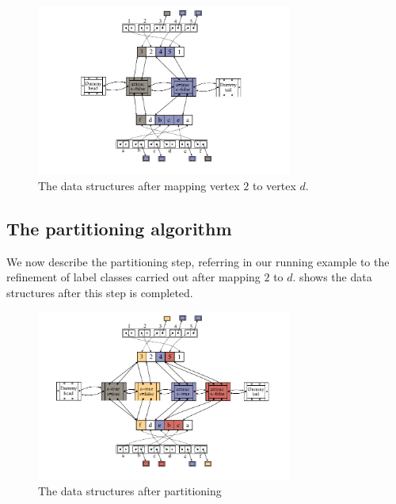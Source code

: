 \begin{figure}[htb]
    \centering
    \includegraphics*[width=0.75\textwidth]{14b-mcsplit-induced-si/figs/data-structure-step-2}
    \caption{The data structures after mapping vertex $2$ to vertex $d$.}
    \label{figure:si-data-structures-2}
\end{figure}

\FloatBarrier

\subsection{The partitioning algorithm}

We now describe the partitioning step, referring in our running example to
the refinement of label classes carried out after mapping $2$ to $d$.
 shows the data structures after this step is completed.

\begin{figure}[htb]
    \centering
    \includegraphics*[width=0.75\textwidth]{14b-mcsplit-induced-si/figs/data-structure-step-3}
    \caption{The data structures after partitioning}
    \label{figure:si-data-structures-3}
\end{figure}

